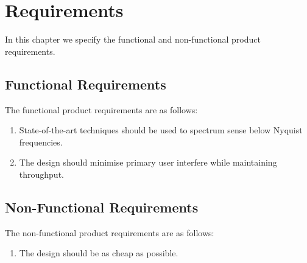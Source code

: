 \documentclass{memoir}
\begin{document}
\chapter{Requirements}
In this chapter we specify the functional and non-functional product requirements.
\section{Functional Requirements}
The functional product requirements are as follows:
\begin{enumerate}
    \item State-of-the-art techniques should be used to spectrum sense below Nyquist frequencies.
    \item The design should minimise primary user interfere while maintaining throughput.
\end{enumerate}

\section{Non-Functional Requirements}
The non-functional product requirements are as follows:
\begin{enumerate}
    \item The design should be as cheap as possible.
\end{enumerate}
\end{document}
